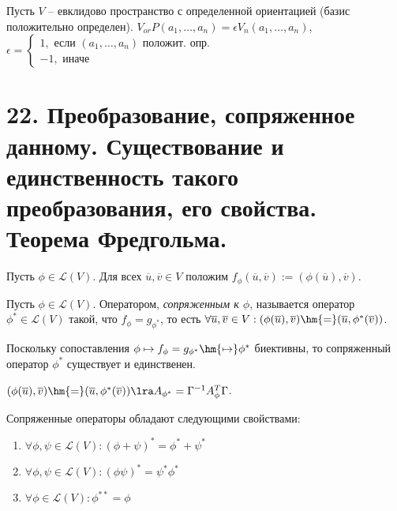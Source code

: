\begin{definition}
    Пусть $V$ -- евклидово пространство с определенной ориентацией (базис положительно определен). $V_{or}P(a_{1}, \ldots, a_{n}) = \epsilon V_{n}(a_{1}, \ldots, a_{n})$, $\epsilon = 
    \begin{cases}
        1,  \text{ если } (a_1, \ldots, a_n) \text{ положит. опр. } \\
        -1, \text{ иначе }
    \end{cases}$ 
\end{definition}

\section{22. Преобразование, сопряженное данному. Существование и единственность такого преобразования, его свойства. Теорема Фредгольма.}

\begin{definition}
    Пусть $\phi \in \mathcal{L}(V)$. Для всех $\overline{u}, \overline{v} \in V$ положим $f_\phi(\overline{u}, \overline{v}) := (\phi(\overline{u}), \overline{v})$.
\end{definition}

\begin{definition}
    Пусть $\phi \in \mathcal{L}(V)$. Оператором, \textit{сопряженным к $\phi$}, называется оператор $\phi^* \in \mathcal{L}(V)$ такой, что $f_\phi = g_{\phi^*}$, то есть $\forall \overline{u}, \overline{v} \in V: (\phi(\overline{u}), \overline{v}) \hm{=} (\overline{u}, \phi^*(\overline{v}))$.
\end{definition}

\begin{note}
    Поскольку сопоставления $\phi \mapsto f_\phi = g_{\phi^*} \hm{\mapsto} \phi^*$ биективны, то сопряженный оператор $\phi^*$ существует и единственен.
\end{note}

\begin{note}
    $(\phi(\overline{u}), \overline{v}) \hm{=} (\overline{u}, \phi^*(\overline{v})) \lra A_{\phi^*} = \Gamma^{-1}A_{\phi}^{T}\Gamma$.
\end{note}

\begin{proposition} Сопряженные операторы обладают следующими свойствами:
    \begin{enumerate}
        \item $\forall \phi, \psi \in \mathcal{L}(V): (\phi + \psi)^* = \phi^* + \psi^*$
        \item $\forall \phi, \psi \in \mathcal{L}(V): (\phi\psi)^* = \psi^*\phi^*$
        \item $\forall \phi \in \mathcal{L}(V): \phi^{**} = \phi$
    \end{enumerate}
\end{proposition}

